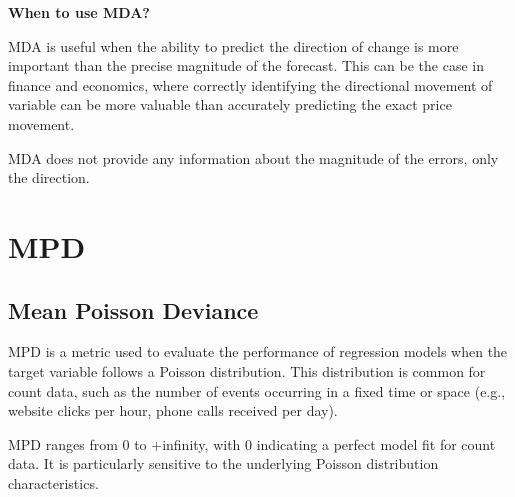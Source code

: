 \textbf{When to use MDA?}

MDA is useful when the ability to predict the direction of change is more important than the precise magnitude of the forecast. This can be the case in finance and economics,
where correctly identifying the directional movement of variable can be more valuable than accurately predicting the exact price movement.

{
    \item MDA does not provide any information about the magnitude of the errors, only the direction.
}

\clearpage
\thispagestyle{regressionstyle}
\section{MPD}
\subsection{Mean Poisson Deviance}

MPD is a metric used to evaluate the performance of regression models when the target variable follows a Poisson distribution. This distribution is common for count data, such as the number
of events occurring in a fixed time or space (e.g., website clicks per hour, phone calls received per day).

\begin{center}
\end{center}

MPD ranges from 0 to +infinity, with 0 indicating a perfect model fit for count data. It is particularly sensitive to the underlying Poisson distribution characteristics.

